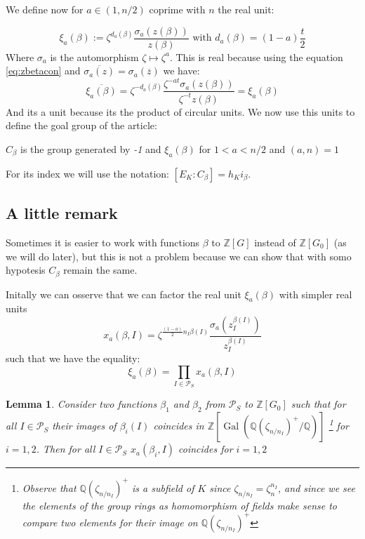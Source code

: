 \documentclass[]{article}
\theoremstyle{plain}
\newtheorem{lem}[teo]{Lemma}
\theoremstyle{remark}
\theoremstyle{definition}
\newcommand{\PS}{\mathcal{P}_S}
\newcommand{\Z}{\mathbb{Z}}
\newcommand{\Q}{\mathbb{Q}}
\DeclareMathOperator{\Gal}{Gal}
\begin{document}
	We define now for $ a \in (1 , n/2)$ coprime with $ n $ the real unit:

	\begin{equation}\label{eq:xi}
		\xi_a (\beta) := \zeta ^{d_a (\beta)} \frac{\sigma_a (z(\beta))}{z(\beta)} \text{ with } d_a(\beta)= (1-a)\frac{t}{2}
	\end{equation}
	Where $\sigma_a$ is the automorphism $ \zeta \mapsto \zeta ^a $. This is real because using the equation \ref{eq:zbetacon} and $ \overline{\sigma_a(z)}= \sigma_a(\overline{z}) $ we have:
	\begin{equation}
		\overline{\xi_a(\beta)} = \zeta ^{-d_a(\beta)} \frac{\zeta^{-at} \sigma_a (z(\beta))}{\zeta^{-t} z(\beta)} = \xi_a(\beta)
	\end{equation}
 	And its a unit because its the product of circular units. %
 	We now use this units to define the goal group of the article:
 	\begin{tcolorbox}
 		$C_\beta $ is the group generated by \textit{-1} and $ \xi_a (\beta) $ for $ 1< a< n/2 $ and $ (a,n)=1 $
 	\end{tcolorbox}
 	For its index we will use the notation: $ [E_K : C_\beta] = h_K i_\beta $. 

	\subsection{A little remark}
	
	Sometimes it is easier to work with functions $\beta$ to $ \Z [G] $ instead of $ \Z [G_0] $ (as we will do later), but this is not a problem because we can show that with somo hypotesis $ C_\beta $ remain the same. 
	
	Initally we can osserve that we can factor the real unit $\xi_a(\beta)$ with simpler real units
	\begin{equation*}
		x_a(\beta , I) = \zeta ^{\frac{(1-a)}{2} n_I \beta (I)} \frac{\sigma_a (	z_I ^{\beta(I)})}{z_I ^{\beta(I)}} 
	\end{equation*}
	such that we have the equality:
	\begin{equation}\label{eq:fact_xi}
		 \xi_a(\beta) = \prod_{I \in \PS}  x_a(\beta , I)
	\end{equation} 
	
	\begin{lem} \label{lem:gooddef}
		Consider two functions $ \beta_1 $ and $ \beta_2 $ from $ \PS $ to $ \Z[G_0] $ such that for all $ I \in \PS $ their images of $ \beta_i (I)$ coincides in $ \Z[\Gal( \Q(\zeta_{n/n_I})^+ / \Q )] $ \footnote{Observe that $ \Q(\zeta_{n/n_I})^+ $ is a subfield of $ K $ since $ \zeta_{n/n_I} =  \zeta_n^{n_I}$, and since we see the elements of the group rings as homomorphism of fields make sense to compare two elements for their image on $\Q(\zeta_{n/n_I})^+ $ %
		} for $ i= 1,2 $. Then for all $ I \in \PS $ $ x_a(\beta_i, I) $ coincides for $ i=1,2 $
	\end{lem}
\end{document}
